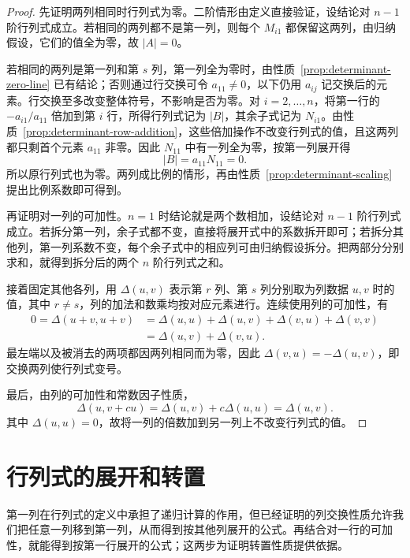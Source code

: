 \begin{proof}
先证明两列相同时行列式为零。二阶情形由定义直接验证，设结论对 $n-1$ 阶行列式成立。若相同的两列都不是第一列，则每个 $M_{i1}$ 都保留这两列，由归纳假设，它们的值全为零，故 $|A|=0$。

若相同的两列是第一列和第 $s$ 列，第一列全为零时，由性质~\ref{prop:determinant-zero-line} 已有结论；否则通过行交换可令 $a_{11}\ne 0$，以下仍用 $a_{ij}$ 记交换后的元素。行交换至多改变整体符号，不影响是否为零。对 $i=2,\ldots,n$，将第一行的 $-a_{i1}/a_{11}$ 倍加到第 $i$ 行，所得行列式记为 $|B|$，其余子式记为 $N_{i1}$。由性质~\ref{prop:determinant-row-addition}，这些倍加操作不改变行列式的值，且这两列都只剩首个元素 $a_{11}$ 非零。因此 $N_{11}$ 中有一列全为零，按第一列展开得
\[
    |B|=a_{11}N_{11}=0.
\]
所以原行列式也为零。两列成比例的情形，再由性质~\ref{prop:determinant-scaling} 提出比例系数即可得到。

再证明对一列的可加性。$n=1$ 时结论就是两个数相加，设结论对 $n-1$ 阶行列式成立。若拆分第一列，余子式都不变，直接将展开式中的系数拆开即可；若拆分其他列，第一列系数不变，每个余子式中的相应列可由归纳假设拆分。把两部分分别求和，就得到拆分后的两个 $n$ 阶行列式之和。

接着固定其他各列，用 $\Delta(u,v)$ 表示第 $r$ 列、第 $s$ 列分别取为列数据 $u,v$ 时的值，其中 $r\ne s$，列的加法和数乘均按对应元素进行。连续使用列的可加性，有
\[
    \begin{aligned}
    0=\Delta(u+v,u+v)
     &=\Delta(u,u)+\Delta(u,v)+\Delta(v,u)+\Delta(v,v)\\
     &=\Delta(u,v)+\Delta(v,u).
    \end{aligned}
\]
最左端以及被消去的两项都因两列相同而为零，因此 $\Delta(v,u)=-\Delta(u,v)$，即交换两列使行列式变号。

最后，由列的可加性和常数因子性质，
\[
    \Delta(u,v+cu)=\Delta(u,v)+c\Delta(u,u)=\Delta(u,v).
\]
其中 $\Delta(u,u)=0$，故将一列的倍数加到另一列上不改变行列式的值。
\end{proof}


\section{行列式的展开和转置}
\label{sec:determinant-expansion-transpose}

第一列在行列式的定义中承担了递归计算的作用，但已经证明的列交换性质允许我们把任意一列移到第一列，从而得到按其他列展开的公式。再结合对一行的可加性，就能得到按第一行展开的公式；这两步为证明转置性质提供依据。

